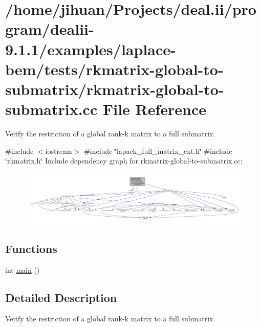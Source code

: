 \hypertarget{rkmatrix-global-to-submatrix_8cc}{}\section{/home/jihuan/\+Projects/deal.ii/program/dealii-\/9.1.1/examples/laplace-\/bem/tests/rkmatrix-\/global-\/to-\/submatrix/rkmatrix-\/global-\/to-\/submatrix.cc File Reference}
\label{rkmatrix-global-to-submatrix_8cc}


Verify the restriction of a global rank-\/k matrix to a full submatrix.  


{\ttfamily \#include $<$iostream$>$}\newline
{\ttfamily \#include \char`\"{}lapack\+\_\+full\+\_\+matrix\+\_\+ext.\+h\char`\"{}}\newline
{\ttfamily \#include \char`\"{}rkmatrix.\+h\char`\"{}}\newline
Include dependency graph for rkmatrix-\/global-\/to-\/submatrix.cc\+:\nopagebreak
\begin{figure}[H]
\begin{center}
\leavevmode
\includegraphics[width=350pt]{rkmatrix-global-to-submatrix_8cc__incl}
\end{center}
\end{figure}
\subsection*{Functions}
\begin{DoxyCompactItemize}
\item 
int \hyperlink{rkmatrix-global-to-submatrix_8cc_ae66f6b31b5ad750f1fe042a706a4e3d4}{main} ()
\end{DoxyCompactItemize}


\subsection{Detailed Description}
Verify the restriction of a global rank-\/k matrix to a full submatrix. 

